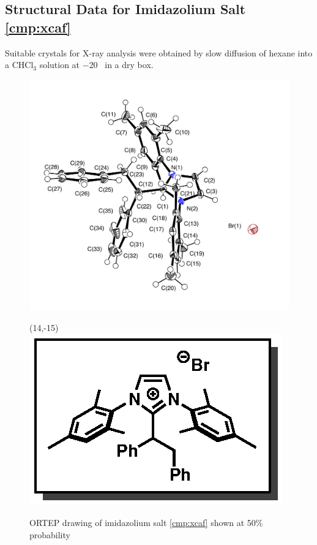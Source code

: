 \subsection{Structural Data for Imidazolium Salt \ref{cmp:xcaf}}
Suitable crystals for X-ray analysis were obtained by slow diffusion of hexane into a CHCl$_3$
solution at $-$20 \degc\  in a dry box. 
\begin{figure}[h]
  \includegraphics[width=6in]{chp_alkylation/images/xray/xcaf_labelled}
    \begin{textblock}{1}(14,-15)
\includegraphics[scale=0.8]{chp_alkylation/images/xcaf}
\end{textblock}
  \caption{ORTEP drawing of  imidazolium salt \ref{cmp:xcaf} shown at 50\% probability }
\end{figure}
